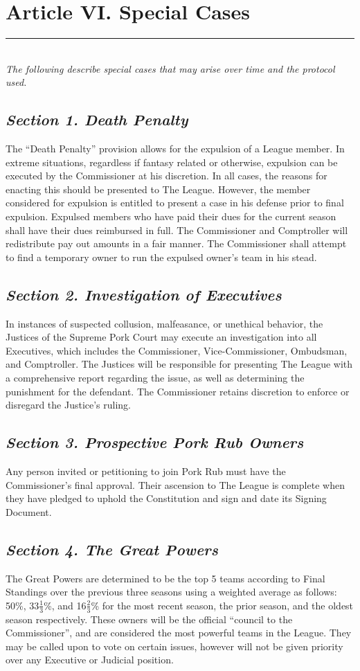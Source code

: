 \documentclass{article}
\begin{document}
\section{Article VI. Special Cases}
    \noindent\rule{\textwidth}{0.5pt}\\

    \textit{The following describe special cases that may arise over time and the protocol used.}
    \subsection{\textit{Section 1. Death Penalty}}
    \noindent The “Death Penalty” provision allows for the expulsion of a League member. In extreme situations, regardless if fantasy related or otherwise, expulsion can be executed by the Commissioner at his discretion.  In all cases, the reasons for enacting this should be presented to The League. However, the member considered for expulsion is entitled to present a case in his defense prior to final expulsion. Expulsed members who have paid their dues for the current season shall have their dues reimbursed in full. The Commissioner and Comptroller will redistribute pay out amounts in a fair manner. The Commissioner shall attempt to find a temporary owner to run the expulsed owner’s team in his stead.
    \subsection{\textit{Section 2. Investigation of Executives}}
    \noindent In instances of suspected collusion, malfeasance, or unethical behavior, the Justices of the Supreme Pork Court may execute an investigation into all Executives, which includes the Commissioner, Vice-Commissioner, Ombudsman, and Comptroller. The Justices will be responsible for presenting The League with a comprehensive report regarding the issue, as well as determining the punishment for the defendant. The Commissioner retains discretion to enforce or disregard the Justice’s ruling.
    \subsection{\textit{Section 3. Prospective Pork Rub Owners}}
    \noindent Any person invited or petitioning to join Pork Rub must have the Commissioner’s final approval. Their ascension to The League is complete when they have pledged to uphold the Constitution and sign and date its Signing Document.
    \subsection{\textit{Section 4. The Great Powers}}
    \noindent The Great Powers are determined to be the top 5 teams according to Final Standings over the previous three seasons using a weighted average as follows: 50\%, 33$\frac{1}{3}$\%, and 16$\frac{2}{3}$\% for the most recent season, the prior season, and the oldest season respectively. These owners will be the official “council to the Commissioner”, and are considered the most powerful teams in the League. They may be called upon to vote on certain issues, however will not be given priority over any Executive or Judicial position.
\end{document}
